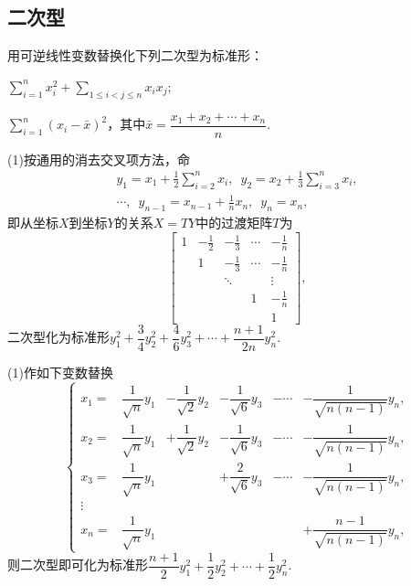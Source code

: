 \subsection{二次型}
\begin{prob}[5]
	用可逆线性变数替换化下列二次型为标准形：
	\begin{mylist}
		\item $\displaystyle\sum_{i=1}^{n}x_i^2+\displaystyle\sum_{1\le i<j\le n}x_ix_j$;
		\item $\displaystyle\sum_{i=1}^{n}(x_i-\bar{x})^2$，其中$\bar{x}=\dfrac{x_1+x_2+\cdots+x_n}{n}$.
	\end{mylist}
\end{prob}
\begin{sol}[法一]
	(1)按通用的消去交叉项方法，命
	\begin{gather*}
		y_1=x_1+\frac{1}{2}\sum_{i=2}^{n}x_i,\enspace y_2=x_2+\frac{1}{3}\sum_{i=3}^{n}x_i,\\
		\cdots,\enspace y_{n-1}=x_{n-1}+\frac{1}{n}x_n,\enspace y_n=x_n,
	\end{gather*}
	即从坐标$X$到坐标$Y$的关系$X=TY$中的过渡矩阵$T$为
	\[
		\begin{bmatrix}
			1 & -\frac{1}{2} & -\frac{1}{3} & \cdots & -\frac{1}{n} \\
			  & 1            & -\frac{1}{3} & \cdots & -\frac{1}{n} \\
			  &              & \ddots       &        & \vdots       \\
			  &              &              & 1      & -\frac{1}{n} \\
			  &              &              &        & 1
		\end{bmatrix},
	\]
	二次型化为标准形$y_1^2+\dfrac{3}{4}y_2^2+\dfrac{4}{6}y_3^2+\cdots+\dfrac{n+1}{2n}y_n^2$.
\end{sol}
\begin{sol}[法二]
	(1)作如下变数替换
	\[
		\left\{
		\begin{array}{rrrrrr}
			x_1=   & \dfrac{1}{\sqrt{n}}y_1 & -\dfrac{1}{\sqrt{2}}y_2 & -\dfrac{1}{\sqrt{6}}y_3 & -\cdots & -\dfrac{1}{\sqrt{n(n-1)}}y_n,   \\
			x_2=   & \dfrac{1}{\sqrt{n}}y_1 & +\dfrac{1}{\sqrt{2}}y_2 & -\dfrac{1}{\sqrt{6}}y_3 & -\cdots & -\dfrac{1}{\sqrt{n(n-1)}}y_n,   \\
			x_3=   & \dfrac{1}{\sqrt{n}}y_1 &                         & +\dfrac{2}{\sqrt{6}}y_3 & -\cdots & -\dfrac{1}{\sqrt{n(n-1)}}y_n,   \\
			\vdots &                        &                         &                         &         &                                 \\
			x_n=   & \dfrac{1}{\sqrt{n}}y_1 &                         &                         &         & +\dfrac{n-1}{\sqrt{n(n-1)}}y_n,
		\end{array}
		\right.
	\]
	则二次型即可化为标准形$\dfrac{n+1}{2}y_1^2+\dfrac{1}{2}y_2^2+\cdots+\dfrac{1}{2}y_n^2$.
\end{sol}
